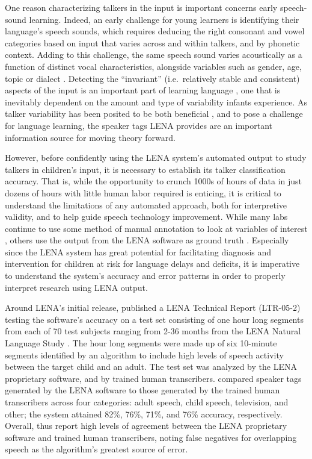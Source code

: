 \documentclass[man,floatsintext]{apa6}
\theoremstyle{definition}
\theoremstyle{definition}
\theoremstyle{definition}
\theoremstyle{remark}
\begin{document}
One reason characterizing talkers in the input is important concerns
early speech-sound learning. Indeed, an early challenge for young
learners is identifying their language's speech sounds, which requires
deducing the right consonant and vowel categories based on input that
varies across and within talkers, and by phonetic context. Adding to
this challenge, the same speech sound varies acoustically as a function
of distinct vocal characteristics, alongside variables such as gender,
age, topic or dialect \citep{Liberman1967}. Detecting the
\enquote{invariant} (i.e.~relatively stable and consistent) aspects of
the input is an important part of learning language \citep{Gogate2010},
one that is inevitably dependent on the amount and type of variability
infants experience. As talker variability has been posited to be both
beneficial \citep[e.g.~][]{Rost2009}, and to pose a challenge
\citep[e.g.~][]{Mullennix1989, Jusczyk1992} for language learning, the
speaker tags LENA provides are an important information source for
moving theory forward.

However, before confidently using the LENA system's automated output to
study talkers in children's input, it is necessary to establish its
talker classification accuracy. That is, while the opportunity to crunch
1000s of hours of data in just dozens of hours with little human labor
required is enticing, it is critical to understand the limitations of
any automated approach, both for interpretive validity, and to help
guide speech technology improvement. While many labs continue to use
some method of manual annotation to look at variables of interest
\citep[e.g.~][]{Weisleder2013, Soderstrom2013, Bergelson2017, Bergelson2018},
others use the output from the LENA software as ground truth
\citep{Johnson2014b}. Especially since the LENA system has great
potential for facilitating diagnosis and intervention for children at
risk for language delays and deficits, it is imperative to understand
the system's accuracy and error patterns in order to properly interpret
research using LENA output.

Around LENA's initial release, \citet{Xu2009} published a LENA Technical
Report (LTR-05-2) testing the software's accuracy on a test set
consisting of one hour long segments from each of 70 test subjects
ranging from 2-36 months from the LENA Natural Language Study
\citep[building on results in][]{Xu2008}. The hour long segments were
made up of six 10-minute segments identified by an algorithm to include
high levels of speech activity between the target child and an adult.
The test set was analyzed by the LENA proprietary software, and by
trained human transcribers. \citet{Xu2009} compared speaker tags
generated by the LENA software to those generated by the trained human
transcribers across four categories: adult speech, child speech,
television, and other; the system attained 82\%, 76\%, 71\%, and 76\%
accuracy, respectively. Overall, \citet{Xu2009} thus report high levels
of agreement between the LENA proprietary software and trained human
transcribers, noting false negatives for overlapping speech as the
algorithm's greatest source of error.
\end{document}
